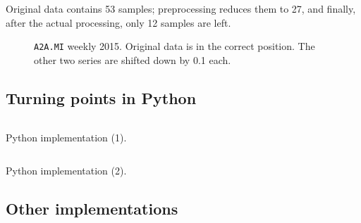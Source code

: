 \documentclass[a4paper]{article}
\begin{document}
Original data contains 53 samples; preprocessing reduces them to 27, and finally, after the actual processing, only 12 samples are left. 

\clearpage %

\begin{figure}%
	
	
	\caption{\texttt{A2A.MI} weekly 2015. Original data is in the correct position. The other two series are shifted down by 0.1 each.}\label{fig:a2a_w_2015}

\end{figure}


\subsection{Turning points in Python}\label{sec:tp_python}
\lipsum[1-3]



\begin{listing}%
 
\inputminted[firstline = 2, lastline = 47]{python}{../code/TPs_Python.py}

\caption{Python implementation (1).}\label{lst:python}

\end{listing}
 
 
\begin{listing}%
 
\inputminted[firstline = 50, lastline = 90, breaklines = true]{python}{../code/TPs_Python.py}

\caption{Python implementation (2).}\label{lst:python2}

\end{listing}
 


\subsection{Other implementations}\label{sec:other}
\lipsum[4-6]





\clearpage
{}
\printbibliography[title={Bibliography}, prenote=prenote] 
\end{document}
